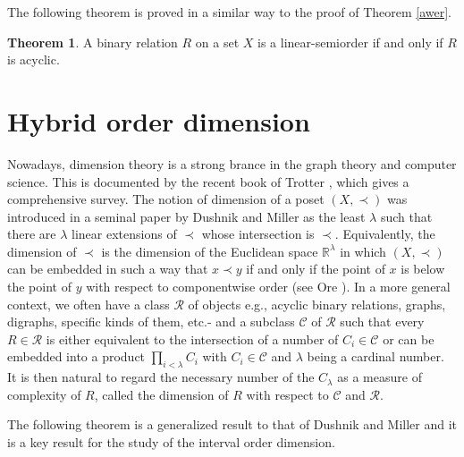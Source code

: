 \documentclass{article}
\theoremstyle{definition}
\newtheorem{theorem}{Theorem}[section]
\begin{document}
The following theorem is proved in a similar way to the proof of Theorem
\ref{awer}.









\begin{theorem}\label{awer1}{\rm 
A binary relation $R$ on a set $X$ is a
linear-semiorder
if and only if $R$ is acyclic.}
\end{theorem}














\section{Hybrid order dimension}






Nowadays, dimension theory is a strong brance in the graph theory and computer science. 
This is documented  by the recent book of Trotter \cite{tro}, which gives a comprehensive survey.
The notion of dimension of a poset $(X,\prec)$ was introduced in a seminal paper by Dushnik and Miller \cite{DM} as the least $\lambda$ such that there are $\lambda$ linear extensions of $\prec$ whose intersection is $\prec$.
Equivalently, the dimension of $\prec$
is the dimension of the Euclidean space $\mathbb{R}^{\lambda}$ in which $(X,\prec)$ can be embedded
in such a way that $x\prec y$ if and only if the point of $x$ is below the point of $y$ with respect to 
componentwise order (see Ore \cite{ore}).
In a more general context, we often have a class $\mathcal{R}$ of objects 
e.g., acyclic binary relations, graphs, digraphs, specific kinds of them, etc.-
and
a subclass $\mathcal{C}$ of $\mathcal{R}$ such that every $R\in \mathcal{R}$ 
is either equivalent to the intersection of a number of $C_{i}\in \mathcal{C}$
or
can be embedded into a 
product $\displaystyle\prod_{i<\lambda} C_{i}$ with $C_{i}\in \mathcal{C}$ and 
$\lambda$ being a cardinal number. 
It is then natural to regard the necessary number of the $C_{\lambda}$ as a measure of complexity of $R$, called the dimension of $R$ with respect to $\mathcal{C}$ and $\mathcal{R}$.





The following theorem is a generalized result to that of Dushnik and Miller and it is a 
key result for the study of the interval order dimension.
\end{document}
